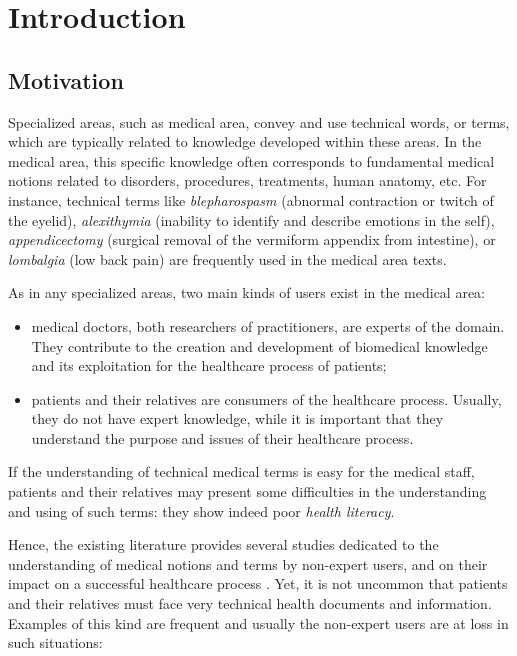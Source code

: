 \chapter{Introduction}

\section{Motivation}
Specialized areas, such as medical area, convey and use technical words, or terms, which are typically related to knowledge developed within these areas. In the medical area, this specific knowledge often corresponds to fundamental medical notions related to disorders, procedures, treatments, human anatomy, etc. For instance, technical terms like \textit{blepharospasm} (abnormal contraction or twitch of the eyelid), \textit{alexithymia} (inability to identify and describe emotions in the self), \textit{appendicectomy} (surgical removal of the vermiform appendix from intestine), or \textit{lombalgia} (low back pain) are frequently used in the medical area texts.

As in any specialized areas, two main kinds of users exist in the medical area:

\begin{itemize}
    \item medical doctors, both researchers of practitioners, are experts of the domain. They contribute to the creation and development of biomedical knowledge and its exploitation for the healthcare process of patients;
    
    \item  patients and their relatives are consumers of the healthcare process. Usually, they do not have expert knowledge, while it is important that they understand the purpose and issues of their healthcare process. 
\end{itemize}
If the understanding of technical medical terms is easy for the medical staff, patients and their relatives may present some difficulties in the understanding and using of such terms: they show indeed poor \textit{health literacy}. 

Hence, the existing literature provides several studies dedicated to the understanding of medical notions and terms by non-expert users, and on their impact on a successful healthcare process \citep{Mcgray-JAMIA2005,Eysenbach-JMIR2007}. Yet, it is not uncommon that patients and their relatives must face very technical health documents and information. Examples of this kind are frequent and usually the non-expert users are at loss in such situations:

